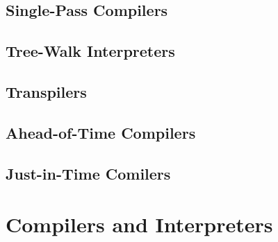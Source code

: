 \subsection{Single-Pass Compilers}
\subsection{Tree-Walk Interpreters}
\subsection{Transpilers}
\subsection{Ahead-of-Time Compilers}
\subsection{Just-in-Time Comilers}

\section{Compilers and Interpreters}
